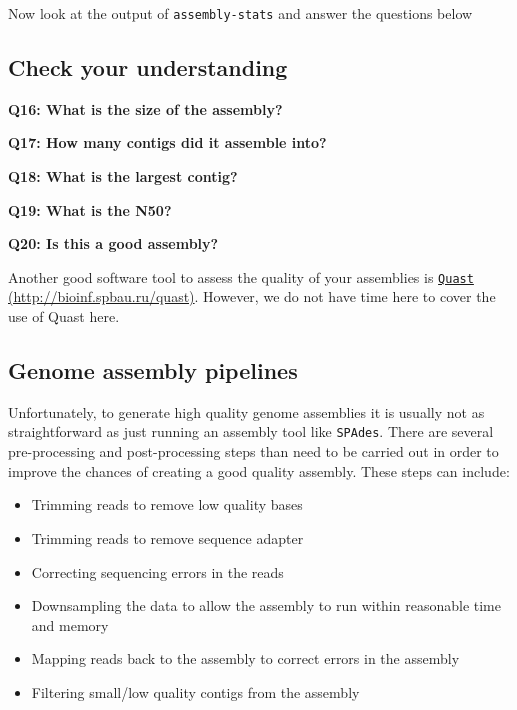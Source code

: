 \documentclass[11pt]{article}
\providecommand{\tightlist}{%
      \setlength{\itemsep}{0pt}\setlength{\parskip}{0pt}}
\begin{document}
    Now look at the output of \texttt{assembly-stats} and answer the
questions below

    \hypertarget{check-your-understanding}{%
\subsection{Check your understanding}\label{check-your-understanding}}

\textbf{Q16: What is the size of the assembly?}

\textbf{Q17: How many contigs did it assemble into?}

\textbf{Q18: What is the largest contig?}

\textbf{Q19: What is the N50?}

\textbf{Q20: Is this a good assembly?}

    Another good software tool to assess the quality of your assemblies is
\href{http://bioinf.spbau.ru/quast}{\texttt{Quast}
(http://bioinf.spbau.ru/quast)}. However, we do not have time here to
cover the use of Quast here.

    \hypertarget{genome-assembly-pipelines}{%
\subsection{Genome assembly pipelines}\label{genome-assembly-pipelines}}

Unfortunately, to generate high quality genome assemblies it is usually
not as straightforward as just running an assembly tool like
\texttt{SPAdes}. There are several pre-processing and post-processing
steps than need to be carried out in order to improve the chances of
creating a good quality assembly. These steps can include:

\begin{itemize}
\tightlist
\item
  Trimming reads to remove low quality bases
\item
  Trimming reads to remove sequence adapter
\item
  Correcting sequencing errors in the reads
\item
  Downsampling the data to allow the assembly to run within reasonable
  time and memory
\item
  Mapping reads back to the assembly to correct errors in the assembly
\item
  Filtering small/low quality contigs from the assembly
\end{itemize}
\end{document}

